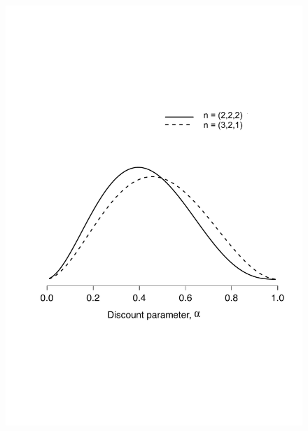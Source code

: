 \documentclass[doc]{apa6}
\begin{document}
\begin{figure}[p]
\begin{center}
\includegraphics[scale=.35]{posteriorFig3a.pdf}

\end{center}
\end{figure}
\end{document}
